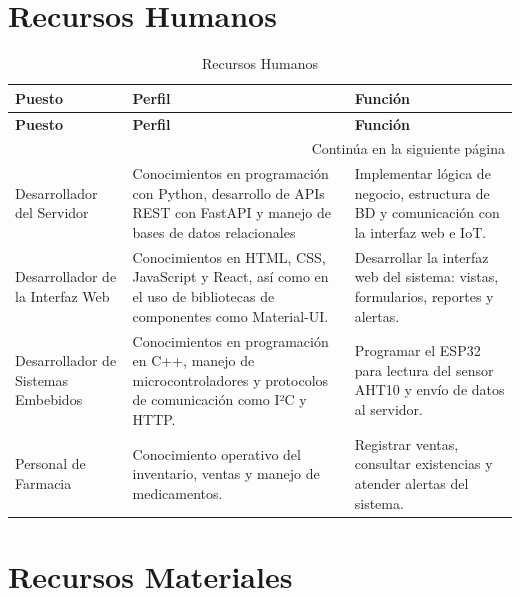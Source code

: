 \section{Recursos Humanos}
\begin{longtable}{|p{3.8cm}|p{4.5cm}|p{5.2cm}|}

\caption{Recursos Humanos} \label{tab:recursos_humanos} \\

\hline
\rowcolor{gray!20}
\textbf{Puesto} & \textbf{Perfil} & \textbf{Función} \\
\hline
\endfirsthead
\hline
\rowcolor{gray!20}
\textbf{Puesto} & \textbf{Perfil} & \textbf{Función} \\
\hline
\endhead
\hline
\multicolumn{3}{|r|}{\small Continúa en la siguiente página} \\
\hline
\endfoot
\hline
\endlastfoot

Desarrollador del Servidor &
Conocimientos en programación con Python, desarrollo de APIs REST con FastAPI y manejo de bases de datos relacionales &
Implementar lógica de negocio, estructura de BD y comunicación con la interfaz web e IoT. \\
\hline

Desarrollador de la Interfaz Web &
Conocimientos en HTML, CSS, JavaScript y React, así como en el uso de bibliotecas de componentes como Material-UI. &
Desarrollar la interfaz web del sistema: vistas, formularios, reportes y alertas. \\
\hline

Desarrollador de Sistemas Embebidos &
Conocimientos en programación en C++, manejo de microcontroladores y protocolos de comunicación como I²C y HTTP. &
Programar el ESP32 para lectura del sensor AHT10 y envío de datos al servidor. \\
\hline

Personal de Farmacia &
Conocimiento operativo del inventario, ventas y manejo de medicamentos. &
Registrar ventas, consultar existencias y atender alertas del sistema. \\
\hline

\end{longtable}




\section{Recursos Materiales}

